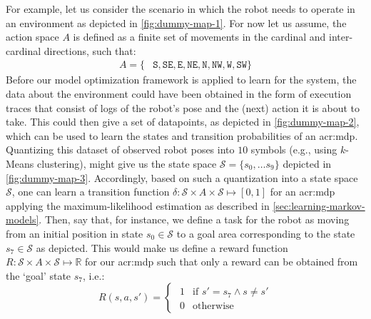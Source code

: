 For example, let us consider the scenario in which the robot needs to operate in an environment as depicted in \autoref{fig:dummy-map-1}.
For now let us assume, the action space $A$ is defined as a finite set of movements in the cardinal and inter-cardinal directions, such that: 
\begin{align*}
	A = \{&\texttt{S}, \texttt{SE}, \texttt{E}, \texttt{NE},
		  \texttt{N}, \texttt{NW}, \texttt{W}, \texttt{SW}  \}
\end{align*}\newpage
Before our model optimization framework is applied to learn  for the system, the data about the environment could have been obtained in the form of execution traces that consist of logs of the robot's pose and the (next) action it is about to take.
This could then give a set of datapoints, as depicted in \autoref{fig:dummy-map-2}, which can be used to learn the states and transition probabilities of an \acrshort{acr:mdp}.
Quantizing this dataset of observed robot poses into $10$ symbols (e.g., using $k$-Means clustering), might give us the state space $\mathcal{S} = \{s_0, \ldots s_9\}$ depicted in \autoref{fig:dummy-map-3}.
Accordingly, based on such a quantization into a state space $\mathcal{S}$, one can learn a transition function $\delta: \mathcal{S} \times A \times \mathcal{S} \mapsto [0, 1]$ for an \acrshort{acr:mdp} applying the maximum-likelihood estimation as described in \autoref{sec:learning-markov-models}.
Then, say that, for instance, we define a task for the robot as moving from an initial position in state $s_0 \in \mathcal{S}$ to a goal area corresponding to the state $s_7 \in \mathcal{S}$ as depicted.
This would make us define a reward function $R: \mathcal{S} \times A \times \mathcal{S} \mapsto \mathbb{R}$ for our \acrshort{acr:mdp} such that only a reward can be obtained from the `goal' state $s_7$, i.e.:
\[
R(s, a, s') = 
\begin{cases}
\hspace{4pt} 	1 & \text{if } s' = s_7 \land s \neq s'\\
\hspace{4pt} 	0 & \text{otherwise}
\end{cases}
\]

